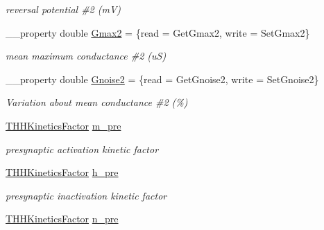 \begin{DoxyCompactItemize}
\begin{DoxyCompactList}\small\item\em reversal potential \#2 (m\+V) \end{DoxyCompactList}\item 
\hypertarget{class_t_h_h2_current_ad518a6e375f6702be1a75b235b1f4b70}{\+\_\+\+\_\+property double \hyperlink{class_t_h_h2_current_ad518a6e375f6702be1a75b235b1f4b70}{Gmax2} = \{read = Get\+Gmax2, write = Set\+Gmax2\}}\label{class_t_h_h2_current_ad518a6e375f6702be1a75b235b1f4b70}

\begin{DoxyCompactList}\small\item\em mean maximum conductance \#2 (u\+S) \end{DoxyCompactList}\item 
\hypertarget{class_t_h_h2_current_a6bebb5c06368b24ce3ff28ac863dca86}{\+\_\+\+\_\+property double \hyperlink{class_t_h_h2_current_a6bebb5c06368b24ce3ff28ac863dca86}{Gnoise2} = \{read = Get\+Gnoise2, write = Set\+Gnoise2\}}\label{class_t_h_h2_current_a6bebb5c06368b24ce3ff28ac863dca86}

\begin{DoxyCompactList}\small\item\em Variation about mean conductance \#2 (\%) \end{DoxyCompactList}\item 
\hypertarget{class_t_h_h2_current_a8062626a434adb2c4176f217785932c4}{\hyperlink{class_t_h_h_kinetics_factor}{T\+H\+H\+Kinetics\+Factor} \hyperlink{class_t_h_h2_current_a8062626a434adb2c4176f217785932c4}{m\+\_\+pre}}\label{class_t_h_h2_current_a8062626a434adb2c4176f217785932c4}

\begin{DoxyCompactList}\small\item\em presynaptic activation kinetic factor \end{DoxyCompactList}\item 
\hypertarget{class_t_h_h2_current_a5401075bf505a9e7f51a9d9458b0a2ed}{\hyperlink{class_t_h_h_kinetics_factor}{T\+H\+H\+Kinetics\+Factor} \hyperlink{class_t_h_h2_current_a5401075bf505a9e7f51a9d9458b0a2ed}{h\+\_\+pre}}\label{class_t_h_h2_current_a5401075bf505a9e7f51a9d9458b0a2ed}

\begin{DoxyCompactList}\small\item\em presynaptic inactivation kinetic factor \end{DoxyCompactList}\item 
\hypertarget{class_t_h_h2_current_a3366e3f7700b429d09e23b97cac0530c}{\hyperlink{class_t_h_h_kinetics_factor}{T\+H\+H\+Kinetics\+Factor} \hyperlink{class_t_h_h2_current_a3366e3f7700b429d09e23b97cac0530c}{n\+\_\+pre}}\label{class_t_h_h2_current_a3366e3f7700b429d09e23b97cac0530c}


\end{DoxyCompactItemize}
